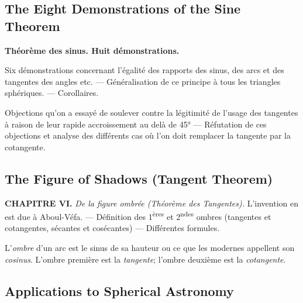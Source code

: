 \documentclass[11pt,a4paper]{article}
\theoremstyle{plain}
\theoremstyle{definition}
\theoremstyle{remark}
\begin{document}
\subsection{The Eight Demonstrations of the Sine Theorem}

\label{sec:sine-theorem}





\textbf{Théorème des sinus. Huit démonstrations.}



Six démonstrations concernant l'égalité des rapports des sinus, des arcs et des tangentes des angles etc. --- Généralisation de ce principe à tous les triangles sphériques. --- Corollaires.



Objections qu'on a essayé de soulever contre la légitimité de l'usage des tangentes à raison de leur rapide accroissement au delà de 45° --- Réfutation de ces objections et analyse des différents cas où l'on doit remplacer la tangente par la cotangente.





\subsection{The Figure of Shadows (Tangent Theorem)}

\label{sec:shadows}





\textbf{CHAPITRE VI.} \textit{De la figure ombrée (Théorème des Tangentes).} L'invention en est due à Aboul-Véfa. --- Définition des 1\textsuperscript{ères} et 2\textsuperscript{ndes} ombres (tangentes et cotangentes, sécantes et cosécantes) --- Différentes formules.



L'\textit{ombre} d'un arc est le sinus de sa hauteur ou ce que les modernes appellent son \textit{cosinus}. L'ombre première est la \textit{tangente}; l'ombre deuxième est la \textit{cotangente}.





\subsection{Applications to Spherical Astronomy}

\label{sec:applications}
\end{document}
